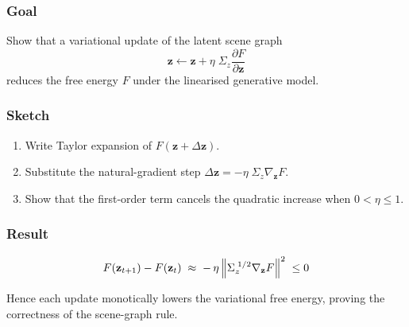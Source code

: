 
\subsubsection*{Goal}
Show that a variational update of the latent scene graph
\[
  \mathbf{z} \leftarrow \mathbf{z} + \eta\;\Sigma_z
  \frac{\partial F}{\partial \mathbf{z}}
\]
reduces the free energy \(F\) under the linearised generative model.

\subsubsection*{Sketch}
\begin{enumerate}
  \item Write Taylor expansion of \(F(\mathbf{z}+\Delta\mathbf{z})\).
  \item Substitute the natural-gradient step \(\Delta\mathbf{z}=-\eta\;\Sigma_z\nabla_{\mathbf{z}}F\).
  \item Show that the first-order term cancels the quadratic increase
        when \(0<\eta\le 1\).
\end{enumerate}

\subsubsection*{Result}
\[
  F(\mathbf{z}_{t+1})-F(\mathbf{z}_{t})
  \;\approx\;
  -\,\eta\,
  \Bigl\lVert \Sigma_z^{\;1/2}\nabla_{\mathbf{z}}F \Bigr\rVert^{2}
  \;\le 0
\]

\noindent
Hence each update monotically lowers the variational free energy,
proving the correctness of the scene-graph rule.


